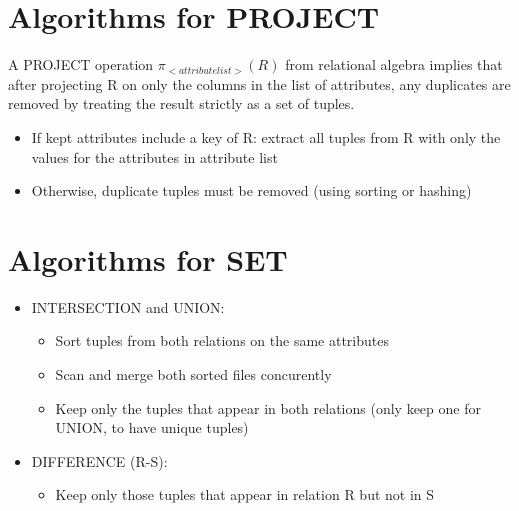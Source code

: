 



\section{Algorithms for PROJECT}
A PROJECT operation $\pi_{<attribute list>} (R)$ from relational algebra implies that after projecting R on only the columns in the list of attributes, any duplicates are removed by treating the result strictly as a set of tuples.

\begin{itemize}
    \item If kept attributes include a key of R: extract all tuples from R with only the values for the attributes in attribute list
    \item Otherwise, duplicate tuples must be removed (using sorting or hashing)
\end{itemize}

\section{Algorithms for SET}
\begin{itemize}
    \item INTERSECTION and UNION:
    \begin{itemize}
        \item Sort tuples from both relations on the same attributes
        \item Scan and merge both sorted files concurently
        \item Keep only the tuples that appear in both relations (only keep one for UNION, to have unique tuples)
    \end{itemize}
    \item DIFFERENCE (R-S):
    \begin{itemize}
        \item Keep only those tuples that appear in relation R but not in S
    \end{itemize}
\end{itemize}

